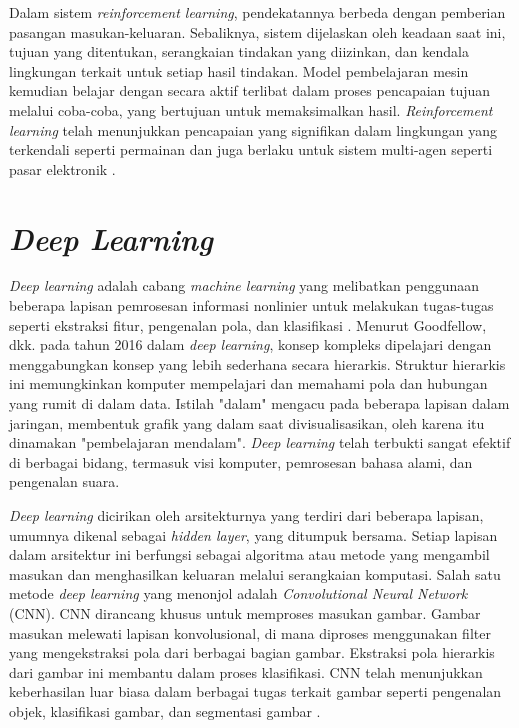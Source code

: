 Dalam sistem \emph{reinforcement learning}, pendekatannya berbeda dengan pemberian pasangan masukan-keluaran. Sebaliknya, sistem dijelaskan oleh keadaan saat ini, tujuan yang ditentukan, serangkaian tindakan yang diizinkan, dan kendala lingkungan terkait untuk setiap hasil tindakan. Model pembelajaran mesin kemudian belajar dengan secara aktif terlibat dalam proses pencapaian tujuan melalui coba-coba, yang bertujuan untuk memaksimalkan hasil. \emph{Reinforcement learning} telah menunjukkan pencapaian yang signifikan dalam lingkungan yang terkendali seperti permainan dan juga berlaku untuk sistem multi-agen seperti pasar elektronik \parencite{Janiesch}.

\section{\emph{Deep Learning}}
\label{sec:deeplearning}

\emph{Deep learning} adalah cabang \emph{machine learning} yang melibatkan penggunaan beberapa lapisan pemrosesan informasi nonlinier untuk melakukan tugas-tugas seperti ekstraksi fitur, pengenalan pola, dan klasifikasi \parencite{Deng}. Menurut Goodfellow, dkk. pada tahun 2016 dalam \emph{deep learning}, konsep kompleks dipelajari dengan menggabungkan konsep yang lebih sederhana secara hierarkis. Struktur hierarkis ini memungkinkan komputer mempelajari dan memahami pola dan hubungan yang rumit di dalam data. Istilah "dalam" mengacu pada beberapa lapisan dalam jaringan, membentuk grafik yang dalam saat divisualisasikan, oleh karena itu dinamakan "pembelajaran mendalam". \emph{Deep learning} telah terbukti sangat efektif di berbagai bidang, termasuk visi komputer, pemrosesan bahasa alami, dan pengenalan suara.

\emph{Deep learning} dicirikan oleh arsitekturnya yang terdiri dari beberapa lapisan, umumnya dikenal sebagai \emph{hidden layer}, yang ditumpuk bersama. Setiap lapisan dalam arsitektur ini berfungsi sebagai algoritma atau metode yang mengambil masukan dan menghasilkan keluaran melalui serangkaian komputasi. Salah satu metode \emph{deep learning} yang menonjol adalah \emph{Convolutional Neural Network} (CNN). CNN dirancang khusus untuk memproses masukan gambar. Gambar masukan melewati lapisan konvolusional, di mana diproses menggunakan filter yang mengekstraksi pola dari berbagai bagian gambar. Ekstraksi pola hierarkis dari gambar ini membantu dalam proses klasifikasi. CNN telah menunjukkan keberhasilan luar biasa dalam berbagai tugas terkait gambar seperti pengenalan objek, klasifikasi gambar, dan segmentasi gambar \parencite{Danukusumo}.

